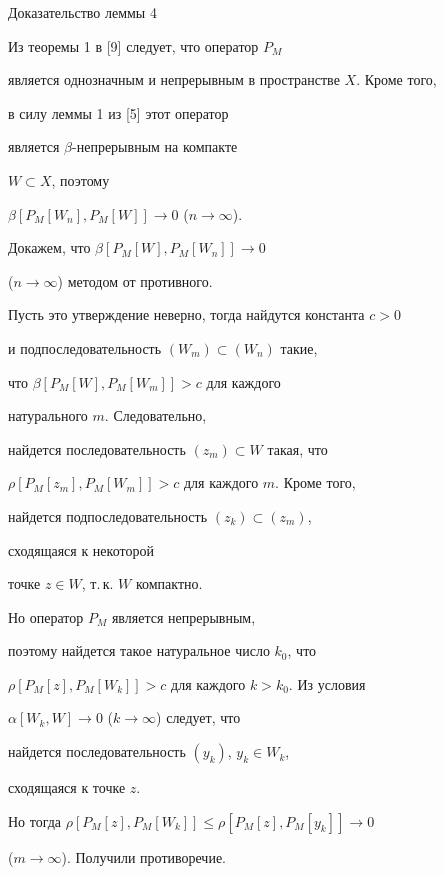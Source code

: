 \begin{pf*}{Доказательство леммы 4}


Из теоремы 1 в [9] следует, что оператор $P_{M}$ 


является однозначным и непрерывным в пространстве $X$. Кроме того,


в силу леммы 1 из [5] этот оператор 


является $\beta$-непрерывным на компакте 


$W \subset X$, поэтому


$\beta [P_{M}[W_{n}],P_{M}[W]] \rightarrow 0$ ($n \rightarrow \infty$). 


Докажем, что  $\beta [P_{M}[W],P_{M}[W_{n}]] \rightarrow 0$


($n \rightarrow \infty$) методом от противного. 


Пусть это утверждение неверно, тогда найдутся константа $c > 0$ 


и подпоследовательность $(W_{m}) \subset (W_{n})$ такие,


что $\beta [P_{M}[W],P_{M}[W_{m}]] > c$ для каждого 


натурального $m$. Следовательно,


найдется последовательность $(z_{m}) \subset W$ такая, что 


$\rho [P_{M}[z_{m}],P_{M}[W_{m}]] > c$ для каждого $m$. Кроме того, 


найдется подпоследовательность $(z_{k}) \subset (z_{m})$, 


сходящаяся к некоторой 


точке $z \in W$, т.\,к. $W$ компактно. 


Но оператор $P_{M}$ является непрерывным,


поэтому найдется такое натуральное число $k_{0}$, что 


$\rho [P_{M}[z],P_{M}[W_{k}]] > c$ для каждого $k > k_{0}$. Из условия


$\alpha [W_{k},W] \rightarrow 0$ ($k \rightarrow \infty$) следует, что


найдется последовательность $(y_{k})$, $y_{k} \in W_{k}$, 


сходящаяся к точке $z$.


Но тогда $\rho[P_{M}[z],P_{M}[W_{k}]]\le\rho[P_{M}[z],P_{M}[y_{k}]]\to 0$ 


($m \rightarrow \infty $). Получили противоречие.


\end{pf*}









